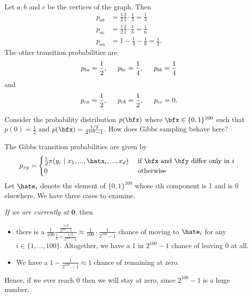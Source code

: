 \begin{homework}[e]
\begin{prf}
\begin{align*}
    \end{align*}
    Let $a,b$ and $c$ be the vertices of the graph. Then
    \begin{align*}
      p_{ab} &= \frac{1}{2}\frac{2}{1}\cdot \frac{1}{3} = \frac{1}{3} \\
      p_{ac} &= \frac{1}{2}\frac{2}{1}\cdot \frac{1}{6} = \frac{1}{6} \\
      p_{aa} &= 1 - \frac{1}{3} - \frac{1}{6} = \frac{1}{2}.
    \end{align*}
    The other transition probabilities are
    \begin{align*}
      p_{ba} = \frac{1}{2}, \hspace{1.5em} p_{bc} = \frac{1}{4}, \hspace{1.5em} p_{bb} = \frac{1}{4}
    \end{align*}
    and
    \begin{align*}
      p_{ca} = \frac{1}{2}, \hspace{1.5em} p_{cb} = \frac{1}{2}, \hspace{1.5em} p_{cc} = 0.
    \end{align*}
  \end{prf}
  \prob Consider the probability distribution $p(\bfx)$ where $\bfx \in \{0,1\}^{100}$ such that $p(0) = \frac{1}{2}$ and $p(\bfx) = \frac{1/2}{2^{100}-1}$. How does Gibbs sampling behave here?
  \begin{prf}
    The Gibbs transition probabilities are given by
    \begin{align*}
      p_{xy} =
      \begin{cases}
        \frac{1}{d}\pi(y_i ~|~ x_1,...,\hatx_i,...,x_d) & \text{ if $\bfx$ and $\bfy$ differ only in $i$} \\
        0 & \text{ otherwise }
      \end{cases}.
    \end{align*}
    Let $\hate_i$ denote the element of $\{0,1\}^{100}$ whose $i$th component is 1 and is 0 elsewhere.
    We have three cases to examine.

    \bigskip 

    \noindent\emph{If we are currently at }$\mathbf{0}$, then
    \begin{itemize}
    \item there is a $\frac{1}{100}\frac{\frac{1/2}{2^{100}-1}}{\frac{1}{2}+\frac{1/2}{2^{100}-1}} \approx \frac{1}{100}\cdot \frac{1}{2^{100}-1}$ chance of moving to $\hate_i$ for any $i \in \{1,...,100\}$. Altogether, we have a $1$ in $2^{100} - 1$ chance of leaving $0$ at all.
    \item We have a $1 - \frac{1}{2^{100}-1}\approx 1$ chance of remaining at zero.
    \end{itemize}
    Hence, if we ever reach 0 then we will stay at zero, since $2^{100}-1$ is a huge number.


\end{prf}
\end{homework}
